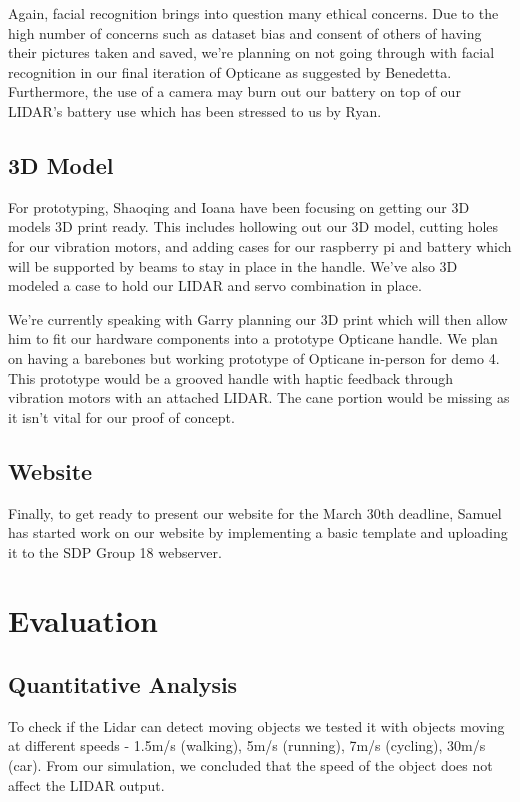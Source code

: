 \documentclass{article}
\begin{document}
Again, facial recognition brings into question many ethical concerns. Due to the high number of concerns such as dataset bias and consent of others of having their pictures taken and saved, we're planning on not going through with facial recognition in our final iteration of Opticane as suggested by Benedetta. Furthermore, the use of a camera may burn out our battery on top of our LIDAR's battery use which has been stressed to us by Ryan.

\subsection{3D Model}

For prototyping, Shaoqing and Ioana have been focusing on getting our 3D models 3D print ready. This includes hollowing out our 3D model, cutting holes for our vibration motors, and adding cases for our raspberry pi and battery which will be supported by beams to stay in place in the handle. We've also 3D modeled a case to hold our LIDAR and servo combination in place.

We're currently speaking with Garry planning our 3D print which will then allow him to fit our hardware components into a prototype Opticane handle. We plan on having a barebones but working prototype of Opticane in-person for demo 4. This prototype would be a grooved handle with haptic feedback through vibration motors with an attached LIDAR. The cane portion would be missing as it isn't vital for our proof of concept.

\subsection{Website}

Finally, to get ready to present our website for the March 30th deadline, Samuel has started work on our website by implementing a basic template and uploading it to the SDP Group 18 webserver.

\section{Evaluation}

\subsection{Quantitative Analysis}

To check if the Lidar can detect moving objects we tested it with objects moving at different speeds - 1.5m/s (walking), 5m/s (running), 7m/s (cycling), 30m/s (car). From our simulation, we concluded that the speed of the object does not affect the LIDAR output.
\end{document}
